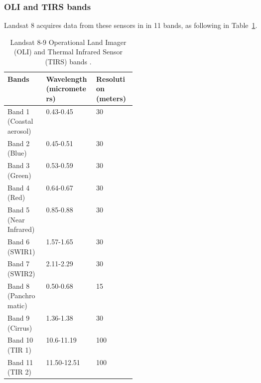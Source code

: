 \documentclass[11pt, a4paper]{report}
\begin{document}
	\subsubsection{OLI and TIRS bands}
	
	Landsat 8 acquires data from these sensors in in 11 bands, as following in Table~\ref{table:bands_table}.
	
	\begin{table} [h]
		\center
		\begin{tabularx}{480pt}{|p{0.3\linewidth}|X|X|}
			\toprule
			\textbf{Bands} & \textbf{Wavelength (micrometers)} & \textbf{Resolution (meters)} \\ [0.2ex]
			\midrule
			\midrule
			Band 1 (Coastal aerosol) & 0.43-0.45 & 30 \\ [0.2ex]
			\midrule
			Band 2 (Blue) & 0.45-0.51 & 30 \\ [0.2ex]
			\midrule
			Band 3 (Green) & 0.53-0.59 & 30 \\ [0.2ex]
			\midrule
			Band 4 (Red) & 0.64-0.67 & 30 \\ [0.2ex]
			\hline
			Band 5 (Near Infrared) & 0.85-0.88 & 30 \\ [0.2ex]
			\midrule
			Band 6 (SWIR1) & 1.57-1.65 & 30 \\ [0.2ex]
			\midrule
			Band 7 (SWIR2) & 2.11-2.29 & 30 \\ [0.2ex]
			\midrule
			Band 8 (Panchromatic) & 0.50-0.68 & 15 \\ [0.2ex]
			\midrule
			Band 9 (Cirrus) & 1.36-1.38 & 30 \\ [0.2ex]
			\midrule
			Band 10 (TIR 1) & 10.6-11.19 & 100  \\ [0.2ex]
			\midrule
			Band 11 (TIR 2) & 11.50-12.51 & 100 \\ [0.2ex]
			\midrule
			\bottomrule
		\end{tabularx}
		\caption{Landsat 8-9 Operational Land Imager (OLI) and Thermal Infrared Sensor (TIRS) bands \cite{bands}.}
		\label{table:bands_table}
	\end{table}
	
\end{document}
